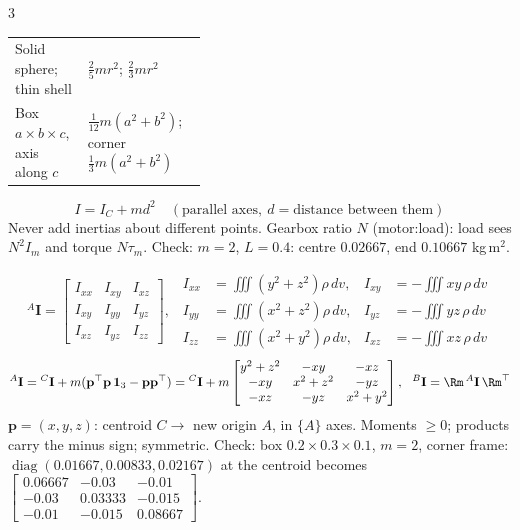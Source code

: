 \begin{multicols}{3}
\begin{fbx}
\begin{tabularx}{\linewidth}{@{}>{\raggedright\arraybackslash}p{0.38\linewidth}X@{}}
Solid sphere; thin shell & $\tfrac25mr^2$; $\tfrac23mr^2$\\
Box $a\times b\times c$, axis along $c$ & $\tfrac1{12}m(a^2+b^2)$; corner $\tfrac13m(a^2+b^2)$\\\bottomrule
\end{tabularx}
\[I=I_C+md^2\quad(\text{parallel axes},\ d=\text{distance between them})\]
Never add inertias about different points. Gearbox ratio $N$ (motor:load): load sees $N^2I_m$ and torque $N\tau_m$. Check: $m=2$, $L=0.4$: centre $0.02667$, end $0.10667$ kg\,m$^2$. \chk
\end{fbx}
\begin{fbx}
\[{}^A\mathbf I=\begin{bmatrix}I_{xx}&I_{xy}&I_{xz}\\I_{xy}&I_{yy}&I_{yz}\\I_{xz}&I_{yz}&I_{zz}\end{bmatrix},\ \ \begin{aligned}I_{xx}&=\!\iiint(y^2+z^2)\rho\,dv, & I_{xy}&=-\!\iiint xy\,\rho\,dv\\ I_{yy}&=\!\iiint(x^2+z^2)\rho\,dv, & I_{yz}&=-\!\iiint yz\,\rho\,dv\\ I_{zz}&=\!\iiint(x^2+y^2)\rho\,dv, & I_{xz}&=-\!\iiint xz\,\rho\,dv\end{aligned}\]
\[{}^A\mathbf I={}^C\mathbf I+m(\mathbf p^\top\mathbf p\,\mathbf 1_3-\mathbf p\mathbf p^\top)={}^C\mathbf I+m\begin{bmatrix}y^2+z^2&-xy&-xz\\-xy&x^2+z^2&-yz\\-xz&-yz&x^2+y^2\end{bmatrix},\ \ {}^B\mathbf I=\Rm\,{}^A\mathbf I\,\Rm^\top\]
$\mathbf p=(x,y,z)$: centroid $C\to$ new origin $A$, in $\{A\}$ axes. Moments $\ge0$; products carry the minus sign; symmetric. Check: box $0.2{\times}0.3{\times}0.1$, $m=2$, corner frame: $\operatorname{diag}(0.01667,0.00833,0.02167)$ at the centroid becomes $\begin{bmatrix}0.06667&-0.03&-0.01\\-0.03&0.03333&-0.015\\-0.01&-0.015&0.08667\end{bmatrix}$. \chk
\end{fbx}


\end{multicols}
